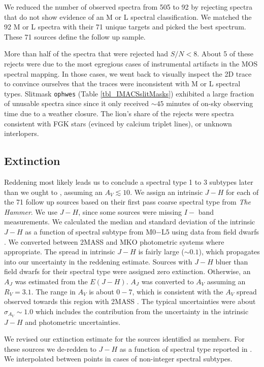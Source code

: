 We reduced the number of observed spectra from 505 to 92 by rejecting spectra that do not show evidence of an M or L spectral classification.  We matched the 92 M or L spectra with their 71 unique targets and picked the best spectrum.  These 71 sources define the follow up sample.  

More than half of the spectra that were rejected had $S/N < 8$.  About 5 of these rejects were due to the most egregious cases of instrumental artifacts in the MOS spectral mapping.  In those cases, we went back to visually inspect the 2D trace to convince ourselves that the traces were inconsistent with M or L spectral types.  Slitmask \texttt{ophwes} (Table \ref{tbl_IMACSslitMasks}) exhibited a large fraction of unusable spectra since since it only received $\sim45$ minutes of on-sky observing time due to a weather closure.  The lion's share of the rejects were spectra consistent with FGK stars (evinced by calcium triplet lines), or unknown interlopers.

\subsection{Extinction}
Reddening most likely leads us to conclude a spectral type 1 to 3 subtypes later than we ought to \citep{2010A&A...515A..75A}, assuming an $A_V\lesssim10$.  We assign an intrinsic $J-H$ for each of the 71 follow up sources based on their first pass coarse spectral type from \emph{The Hammer}.  We use $J-H$, since some sources were missing $I-$ band measurements.  We calculated the median and standard deviation of the intrinsic $J-H$ as a function of spectral subtype from M0$-$L5 using data from field dwarfs \citep{2011AJ....141...97W,2012ApJS..201...19D}.  We converted between 2MASS and MKO photometric systems where appropriate.  The spread in intrinsic $J-H$ is fairly large ($\sim0.1$), which propagates into our uncertainty in the reddening estimate.  Sources with $J-H$ bluer than field dwarfs for their spectral type were assigned zero extinction.  Otherwise, an $A_J$ was estimated from the $E(J-H)$.  $A_J$ was converted to $A_V$ assuming an $R_V=3.1$.  The range in $A_V$ is about $0 - 7$, which is consistent with the $A_V$ spread observed towards this region with 2MASS \citep{2008A&A...489..143L}.  The typical uncertainties were about $\sigma_{A_V}\sim1.0$ which includes the contribution from the uncertainty in the intrinsic $J-H$ and photometric uncertainties.

We revised our extinction estimate for the sources identified as members.  For these sources we de-redden to $J-H$ as a function of spectral type reported in \citet{2013ApJS..208....9P}.  We interpolated between points in cases of non-integer spectral subtypes.


